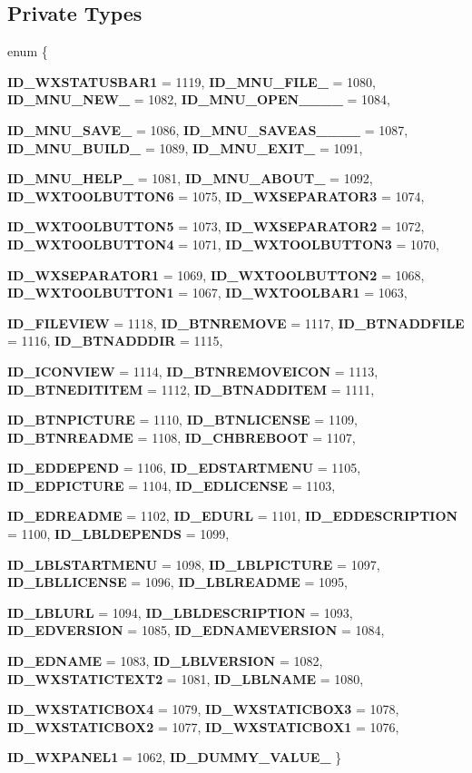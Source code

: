 \subsection*{Private Types}
\begin{CompactItemize}
\item 
enum \{ \par
{\bf ID\_\-WXSTATUSBAR1} =  1119, 
{\bf ID\_\-MNU\_\-FILE\_} =  1080, 
{\bf ID\_\-MNU\_\-NEW\_} =  1082, 
{\bf ID\_\-MNU\_\-OPEN\_\-\_\-\_\-\_} =  1084, 
\par
{\bf ID\_\-MNU\_\-SAVE\_} =  1086, 
{\bf ID\_\-MNU\_\-SAVEAS\_\-\_\-\_\-\_} =  1087, 
{\bf ID\_\-MNU\_\-BUILD\_} =  1089, 
{\bf ID\_\-MNU\_\-EXIT\_} =  1091, 
\par
{\bf ID\_\-MNU\_\-HELP\_} =  1081, 
{\bf ID\_\-MNU\_\-ABOUT\_} =  1092, 
{\bf ID\_\-WXTOOLBUTTON6} =  1075, 
{\bf ID\_\-WXSEPARATOR3} =  1074, 
\par
{\bf ID\_\-WXTOOLBUTTON5} =  1073, 
{\bf ID\_\-WXSEPARATOR2} =  1072, 
{\bf ID\_\-WXTOOLBUTTON4} =  1071, 
{\bf ID\_\-WXTOOLBUTTON3} =  1070, 
\par
{\bf ID\_\-WXSEPARATOR1} =  1069, 
{\bf ID\_\-WXTOOLBUTTON2} =  1068, 
{\bf ID\_\-WXTOOLBUTTON1} =  1067, 
{\bf ID\_\-WXTOOLBAR1} =  1063, 
\par
{\bf ID\_\-FILEVIEW} =  1118, 
{\bf ID\_\-BTNREMOVE} =  1117, 
{\bf ID\_\-BTNADDFILE} =  1116, 
{\bf ID\_\-BTNADDDIR} =  1115, 
\par
{\bf ID\_\-ICONVIEW} =  1114, 
{\bf ID\_\-BTNREMOVEICON} =  1113, 
{\bf ID\_\-BTNEDITITEM} =  1112, 
{\bf ID\_\-BTNADDITEM} =  1111, 
\par
{\bf ID\_\-BTNPICTURE} =  1110, 
{\bf ID\_\-BTNLICENSE} =  1109, 
{\bf ID\_\-BTNREADME} =  1108, 
{\bf ID\_\-CHBREBOOT} =  1107, 
\par
{\bf ID\_\-EDDEPEND} =  1106, 
{\bf ID\_\-EDSTARTMENU} =  1105, 
{\bf ID\_\-EDPICTURE} =  1104, 
{\bf ID\_\-EDLICENSE} =  1103, 
\par
{\bf ID\_\-EDREADME} =  1102, 
{\bf ID\_\-EDURL} =  1101, 
{\bf ID\_\-EDDESCRIPTION} =  1100, 
{\bf ID\_\-LBLDEPENDS} =  1099, 
\par
{\bf ID\_\-LBLSTARTMENU} =  1098, 
{\bf ID\_\-LBLPICTURE} =  1097, 
{\bf ID\_\-LBLLICENSE} =  1096, 
{\bf ID\_\-LBLREADME} =  1095, 
\par
{\bf ID\_\-LBLURL} =  1094, 
{\bf ID\_\-LBLDESCRIPTION} =  1093, 
{\bf ID\_\-EDVERSION} =  1085, 
{\bf ID\_\-EDNAMEVERSION} =  1084, 
\par
{\bf ID\_\-EDNAME} =  1083, 
{\bf ID\_\-LBLVERSION} =  1082, 
{\bf ID\_\-WXSTATICTEXT2} =  1081, 
{\bf ID\_\-LBLNAME} =  1080, 
\par
{\bf ID\_\-WXSTATICBOX4} =  1079, 
{\bf ID\_\-WXSTATICBOX3} =  1078, 
{\bf ID\_\-WXSTATICBOX2} =  1077, 
{\bf ID\_\-WXSTATICBOX1} =  1076, 
\par
{\bf ID\_\-WXPANEL1} =  1062, 
{\bf ID\_\-DUMMY\_\-VALUE\_\-}
 \}
\end{CompactItemize}
